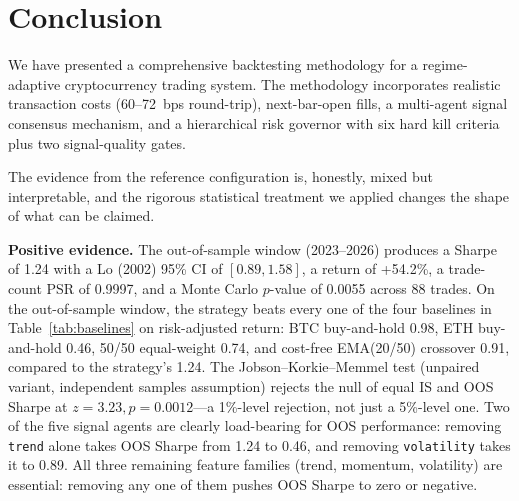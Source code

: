 \documentclass{article}
\begin{document}
\section{Conclusion}
\label{sec:conclusion}

We have presented a comprehensive backtesting methodology for a regime-adaptive cryptocurrency trading system.
The methodology incorporates realistic transaction costs (60--72~bps round-trip), next-bar-open fills, a multi-agent signal consensus mechanism, and a hierarchical risk governor with six hard kill criteria plus two signal-quality gates.

The evidence from the reference configuration is, honestly, mixed but interpretable, and the rigorous statistical treatment we applied changes the shape of what can be claimed.

\textbf{Positive evidence.}
The out-of-sample window (2023--2026) produces a Sharpe of 1.24 with a Lo (2002) 95\% CI of $[0.89, 1.58]$, a return of +54.2\%, a trade-count PSR of 0.9997, and a Monte Carlo $p$-value of 0.0055 across 88 trades.
On the out-of-sample window, the strategy beats every one of the four baselines in Table~\ref{tab:baselines} on risk-adjusted return: BTC buy-and-hold 0.98, ETH buy-and-hold 0.46, 50/50 equal-weight 0.74, and cost-free EMA(20/50) crossover 0.91, compared to the strategy's 1.24.
The Jobson--Korkie--Memmel test (unpaired variant, independent samples assumption) rejects the null of equal IS and OOS Sharpe at $z = 3.23, p = 0.0012$---a 1\%-level rejection, not just a 5\%-level one.
Two of the five signal agents are clearly load-bearing for OOS performance: removing \texttt{trend} alone takes OOS Sharpe from 1.24 to 0.46, and removing \texttt{volatility} takes it to 0.89. All three remaining feature families (trend, momentum, volatility) are essential: removing any one of them pushes OOS Sharpe to zero or negative.
\end{document}
